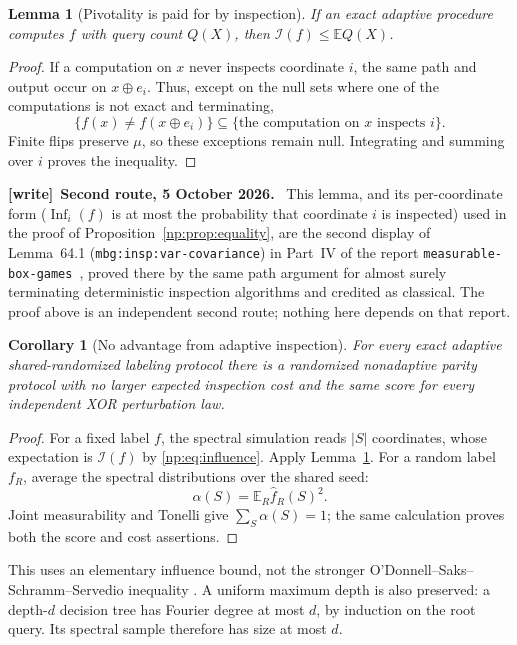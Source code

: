 \documentclass[11pt,a4paper]{article}
\newtheorem{lemma}[theorem]{Lemma}
\newtheorem{corollary}[theorem]{Corollary}
\theoremstyle{definition}
\theoremstyle{remark}
\newcommand{\E}{\mathbb E}
\newcommand{\Inf}{\operatorname{Inf}}
\newcommand{\file}[1]{\nolinkurl{#1}}
\newenvironment{writenote}[1][]{\par\smallskip\begingroup\small
 \noindent\textbf{[write]}\if\relax\detokenize{#1}\relax\else~\textbf{#1.}\fi\ }%
 {\par\endgroup\smallskip}
\begin{document}
\begin{lemma}[Pivotality is paid for by inspection]\label{np:lem:query}
If an exact adaptive procedure computes \(f\) with query count \(Q(X)\),
then \(\mathcal I(f)\le\E Q(X)\).
\end{lemma}
\begin{proof}
If a computation on \(x\) never inspects coordinate \(i\), the same path
and output occur on \(x\oplus e_i\). Thus, except on the null sets where
one of the computations is not exact and terminating,
\[
 \{f(x)\ne f(x\oplus e_i)\}\subseteq
 \{\text{the computation on }x\text{ inspects }i\}.
\]
Finite flips preserve \(\mu\), so these exceptions remain null. Integrating
and summing over \(i\) proves the inequality.
\end{proof}

\begin{writenote}[Second route, 5 October 2026]
This lemma, and its per-coordinate form (\(\Inf_i(f)\) is at most the
probability that coordinate \(i\) is inspected) used in the proof of
Proposition~\ref{np:prop:equality}, are the second display of
Lemma~64.1 (\file{mbg:insp:var-covariance}) in Part~IV of the report
\file{measurable-box-games}~\cite{repoboxart}, proved there by the same
path argument for almost surely terminating deterministic inspection
algorithms and credited as classical. The proof above is an independent
second route; nothing here depends on that report.
\end{writenote}

\begin{corollary}[No advantage from adaptive inspection]
\label{np:cor:simulation}
For every exact adaptive shared-randomized labeling protocol there is
a randomized nonadaptive parity protocol with no larger expected inspection
cost and the same score for every independent XOR perturbation law.
\end{corollary}
\begin{proof}
For a fixed label \(f\), the spectral simulation reads \(|S|\) coordinates,
whose expectation is \(\mathcal I(f)\) by \eqref{np:eq:influence}.
Apply Lemma~\ref{np:lem:query}. For a random label \(f_R\), average the
spectral distributions over the shared seed:
\[
 \alpha(S)=\E_R\widehat f_R(S)^2.
\]
Joint measurability and Tonelli give \(\sum_S\alpha(S)=1\); the same
calculation proves both the score and cost assertions.
\end{proof}

This uses an elementary influence bound, not the stronger
O'Donnell--Saks--Schramm--Servedio inequality \cite{osss}.
A uniform maximum depth is also preserved: a depth-\(d\) decision tree
has Fourier degree at most \(d\), by induction on the root query.
Its spectral sample therefore has size at most \(d\).
\end{document}
